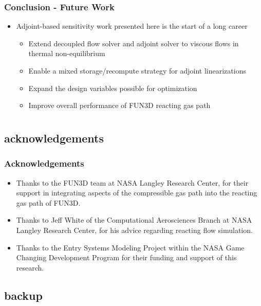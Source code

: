 \documentclass{beamer}
\begin{document}
\begin{frame}
  \frametitle{Conclusion - Future Work}
  \begin{itemize}
    \item Adjoint-based sensitivity work presented here is the start of a
      long career
    \begin{itemize}
      \item Extend decoupled flow solver and adjoint solver to viscous flows in
        thermal non-equilibrium
      \item Enable a mixed storage/recompute strategy for adjoint linearizations
      \item Expand the design variables possible for optimization
      \item Improve overall performance of FUN3D reacting gas path
    \end{itemize}
  \end{itemize}
\end{frame}

\section{}

\subsection{acknowledgements}

\begin{frame}
  \frametitle{Acknowledgements}
  \begin{itemize}
   \item Thanks to the FUN3D team at NASA Langley Research Center, for their
     support in integrating aspects of the compressible gas path into the
     reacting gas path of FUN3D.
   \item Thanks to Jeff White of the Computational Aerosciences Branch at NASA
     Langley Research Center, for his advice regarding reacting flow simulation.
   \item Thanks to the Entry Systems Modeling Project within the NASA
     Game Changing Development Program for their funding and support of this research.  
  \end{itemize}
\end{frame}

\subsection{backup}
\end{document}
